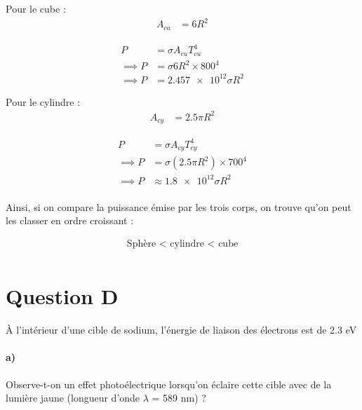\documentclass[11pt, letterpaper]{article}
\begin{document}
Pour le cube : \\

\begin{align*}
    A_{ca} & = 6 R^2
\end{align*}

\begin{align*}
    P          & = \sigma A_{cu} T_{cu}^{4}  \\
    \implies P & = \sigma 6 R^2 \times 800^4 \\
    \implies P & = \num{2.457e12} \sigma R^2
\end{align*}

Pour le cylindre : \\

\begin{align*}
    A_{cy} & = 2.5\pi R^2
\end{align*}

\begin{align*}
    P          & = \sigma  A_{cy}T_{cy}^{4}         \\
    \implies P & = \sigma (2.5\pi R^2) \times 700^4 \\
    \implies P & \approx \num{1.8e12}  \sigma R^2   \\
\end{align*}

\begin{tcolorbox}[tommy]
    Ainsi, si on compare la puissance émise par les trois corps, on trouve qu'on peut les classer en ordre croissant :

    \begin{align*}
        \text{Sphère < cylindre < cube} \\
    \end{align*}

\end{tcolorbox}

\section*{Question D}
À l’intérieur d’une cible de sodium, l’énergie de liaison des électrons est de 2.3 eV

\paragraph*{a)}
Observe-t-on un effet photoélectrique lorsqu’on éclaire cette cible avec de la lumière jaune
(longueur d’onde $\lambda $ = 589 nm) ?\\
\end{document}
